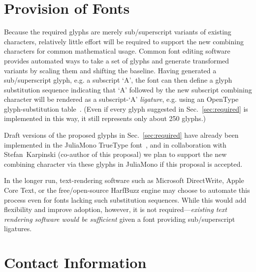 \documentclass[10pt,english]{article}
\newcommand{\secref}[1]{Sec.~\ref{sec:#1}}
\begin{document}
\section{Provision of Fonts}
\label{sec:fonts}

Because the required glyphs are merely sub/superscript variants of existing characters, relatively little effort will be required to support the new combining characters for common mathematical usage. Common font editing software provides automated ways to take a set of glyphs and generate transformed variants by scaling them and shifting the baseline.  Having generated a sub/superscript glyph, e.g. a subscript `A', the font can then define a glyph substitution sequence indicating that `A' followed by the new subscript combining character will be rendered as a subscript-`A' \emph{ligature}, e.g. using an OpenType glyph-substitution table~\cite{opentypeGSUB}.  (Even if every glyph suggested in \secref{required} is implemented in this way, it still represents only about 250 glyphs.)

Draft versions of the proposed glyphs in \secref{required} have already been implemented in the JuliaMono TrueType font~\cite{juliamono}, and in collaboration with Stefan~Karpinski (co-author of this proposal) we plan to support the new combining character via these glyphs in JuliaMono if this proposal is accepted.

In the longer run, text-rendering software such as Microsoft DirectWrite, Apple Core Text, or the free/open-source HarfBuzz engine may choose to automate this process even for fonts
lacking such substitution sequences.   While this would add flexibility and improve adoption, however, it is not required---\emph{existing text rendering software would be sufficient} given a font
providing sub/superscript ligatures.

\section{Contact Information}
\end{document}
